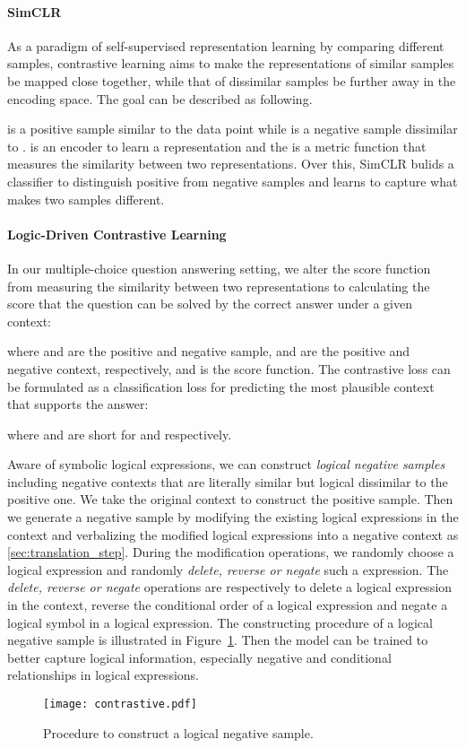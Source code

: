 \documentclass[11pt,a4paper]{article}
\begin{document}
\paragraph{SimCLR}
As a paradigm of self-supervised representation learning by comparing different samples,
contrastive learning  \cite{wu2018unsupervised, le2020contrastive, he2020momentum} aims to make the representations of similar samples be mapped close together, while that of dissimilar samples be further away in the encoding space. The goal can be described as following.

 is a positive sample similar to the data point  while  is a negative sample dissimilar to .  is an encoder to learn a representation and the  is a metric function that measures the similarity between two representations. 
Over this, SimCLR \cite{chen2020simple} bulids a classifier to distinguish positive from negative samples and learns to capture what makes two samples different. 


\paragraph{Logic-Driven Contrastive Learning} In our multiple-choice question answering setting, we alter the score function from measuring the similarity between two representations to calculating the score that the question can be solved by the correct answer under a given context:

where  and  are the positive and negative sample,  and  are the positive and negative context, respectively, and  is the score function.
The contrastive loss can be formulated as a classification loss for predicting the most plausible context that supports the answer:

where  and  are short for  and  respectively. 


Aware of symbolic logical expressions, we can construct \emph{logical negative samples} including negative contexts that are literally similar but logical dissimilar to the positive one. 
We take the original context to construct the positive sample. Then we generate a negative sample by modifying the existing logical expressions in the context and verbalizing the modified logical expressions into a negative context as \cref{sec:translation_step}. During the modification operations, we randomly choose a logical expression and randomly \emph{delete, reverse or negate} such a expression. The \emph{delete, reverse or negate} operations are respectively to delete a logical expression in the context, reverse the conditional order of a logical expression and negate a logical symbol in a logical expression.
The constructing procedure of a logical negative sample is illustrated in Figure~\ref{figure_contrastive}. Then the model can be trained to better capture logical information, especially negative and conditional relationships in logical expressions.
\begin{figure}[!th]
\centering
\texttt{[image: contrastive.pdf]}
\caption{\label{figure_contrastive} Procedure to construct a logical negative sample.}
\end{figure}
\end{document}
